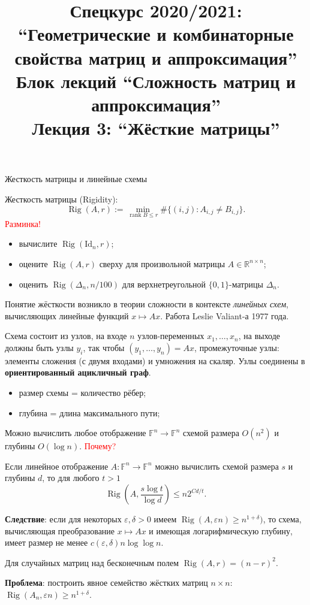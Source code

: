 \documentclass[handout]{beamer}
\title{Спецкурс 2020/2021: ``Геометрические и комбинаторные свойства матриц и
аппроксимация'' \\ Блок лекций ``Сложность матриц и аппроксимация'' \\ Лекция 3:
``Жёсткие матрицы''}
\renewcommand\le{\leqslant}
\renewcommand\ge{\geqslant}
\newcommand\R{\mathbb R}
\newcommand\eps{\varepsilon}
\DeclareMathOperator{\rank}{rank}
\DeclareMathOperator{\Rig}{Rig}
\begin{document}
\maketitle

\begin{frame}{Жесткость матрицы и линейные схемы}

Жесткость матрицы (Rigidity):
$$
    \Rig(A,r) := \min_{\rank B\le r} \#\{(i,j)\colon A_{i,j}\ne B_{i,j}\}.
$$
\pause
    \textcolor{red}{Разминка!}
    \begin{itemize}
        \item вычислите $\Rig(\mathrm{Id}_n,r)$;
            \pause
        \item оцените $\Rig(A,r)$ сверху для произвольной матрицы $A\in\R^{n\times n}$;
            \pause
        \item оценить $\Rig(\Delta_n,n/100)$ для верхнетреугольной
            $\{0,1\}$-матрицы $\Delta_n$.
    \end{itemize}
            \pause
\end{frame}

\begin{frame}
    Понятие жёсткости возникло в теории сложности в контексте \textit{линейных
    схем}, вычисляющих
линейные функций $x\mapsto Ax$. Работа Leslie Valiant-а 1977 года.
\pause
    
Схема состоит из узлов, на входе $n$ узлов-переменных
$x_1,\ldots,x_n$, на выходе должны быть узлы $y_i$, так чтобы
$(y_1,\ldots,y_n)=Ax$, промежуточные узлы: элементы сложения (с двумя
    входами) и умножения на скаляр. Узлы соединены в \textbf{ориентированный
    ацикличный граф}.
\pause
    \begin{itemize}
        \item размер схемы = количество рёбер;
        \item глубина = длина максимального пути;
    \end{itemize}

Можно вычислить любое отображение $\mathbb{F}^n\to\mathbb{F}^n$ схемой размера
$O(n^2)$ и глубины $O(\log n)$. \textcolor{red}{Почему?}

\end{frame}
\begin{frame}

\begin{theorem}[Valiant]
    Если линейное отображение $A\colon\mathbb{F}^n\to\mathbb{F}^n$ можно вычислить схемой размера $s$ и
    глубины $d$, то для любого $t>1$
    $$
    \Rig(A,\frac{s\log t}{\log d}) \le n2^{Cd/t}.
    $$
\end{theorem}
\pause

    \textbf{Следствие}: если для некоторых $\eps,\delta>0$ имеем $\Rig(A,\eps
    n)\ge n^{1+\delta})$, то схема, вычисляющая преобразование $x\mapsto Ax$ и имеющая
    логарифмическую глубину, имеет размер не менее $c(\eps,\delta)n\log\log n$.
    \pause

    Для случайных матриц над бесконечным полем $\Rig(A,r)=(n-r)^2$.

    \textbf{Проблема}: построить явное семейство жёстких матриц $n\times n$:
    $\Rig(A_n,\eps n)\ge n^{1+\delta}$.
    
\end{frame}
\end{document}
